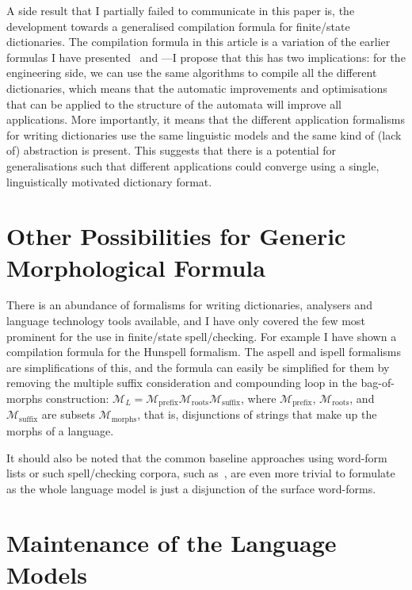 \documentclass[officiallayout,final]{unihelcompling}
\begin{document}
A side result that I partially failed to communicate in this paper is, the
development towards a generalised compilation formula for finite\-/state
dictionaries. The compilation formula in this article is a variation of the
earlier formulas I have presented~\citep{linden2009hfst} and
---I propose that this has two implications:
for the engineering side, we can use the same algorithms to compile all the
different dictionaries, which means that the automatic improvements and
optimisations that can be applied to the structure of the automata will improve
all applications. More importantly, it means that the different application
formalisms for writing dictionaries use the same linguistic models and the same
kind of (lack of) abstraction is present. This suggests that there is a
potential for generalisations such that different applications could converge
using a single, linguistically motivated dictionary format.

\section{Other Possibilities for Generic Morphological Formula}
\label{sec:other-lms}

There is an abundance of formalisms for writing dictionaries, analysers and
language technology tools available, and I have only covered the few most
prominent for the use in finite\-/state spell\-/checking. For example I have
shown a compilation formula for the Hunspell formalism. The aspell and ispell
formalisms are simplifications of this, and the formula can easily be
simplified for them by removing the multiple suffix consideration and
compounding loop in the bag-of-morphs construction: $\mathcal{M}_L =
\mathcal{M}_\mathrm{prefix} \mathcal{M}_\mathrm{roots} \mathcal{M}_\mathrm{suffix}$, where $\mathcal{M}_\mathrm{prefix}$, $\mathcal{M}_\mathrm{roots}$, and 
$\mathcal{M}_\mathrm{suffix}$ are subsets $\mathcal{M}_\mathrm{morphs}$, that
is, disjunctions of strings that make up the morphs of a language.

It should also be noted that the common baseline approaches using word-form
lists or such spell\-/checking corpora, such as~\citet{norvig2010howto}, are
even more trivial to formulate as the whole language model is just a
disjunction of the surface word-forms.

\section{Maintenance of the Language Models}
\label{sec:maintenance}
\end{document}
